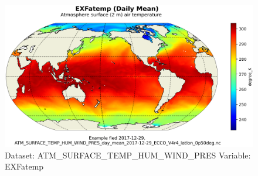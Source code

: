 \begin{figure}[H]
\centering
\includegraphics[scale=0.55]{../images/plots/latlon_plots/Atmosphere_Surface_Temperature_Humidity_Wind_and_Pressure/EXFatemp.png}
\caption{Dataset: ATM\_SURFACE\_TEMP\_HUM\_WIND\_PRES Variable: EXFatemp}
\label{tab:table-ATM_SURFACE_TEMP_HUM_WIND_PRES_EXFatemp-Plot}
\end{figure}
\pagebreak
